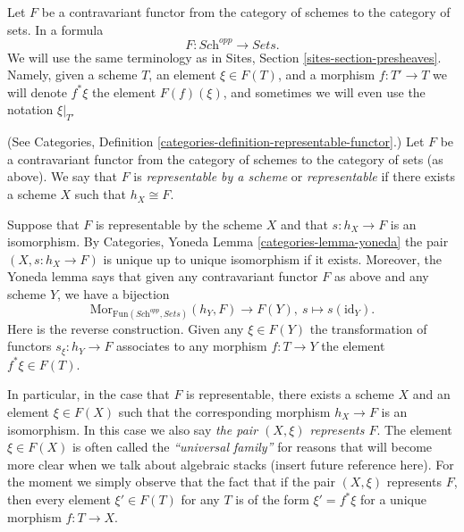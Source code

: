 \medskip\noindent
Let $F$ be a contravariant functor from the category
of schemes to the category of sets. In a formula
$$
F : \textit{Sch}^{opp}
\longrightarrow
\textit{Sets}.
$$
We will use the same terminology as in Sites, Section
\ref{sites-section-presheaves}. Namely, given a scheme
$T$, an element $\xi \in F(T)$, and a morphism $f : T' \to T$
we will denote $f^*\xi$ the element $F(f)(\xi)$, and sometimes
we will even use the notation $\xi|_{T'}$

\begin{definition}
\label{definition-representable-functor}
(See Categories, Definition \ref{categories-definition-representable-functor}.)
Let $F$ be a contravariant functor from the category
of schemes to the category of sets (as above).
We say that $F$ is {\it representable by a scheme}
or {\it representable} if there exists a scheme $X$
such that $h_X \cong F$.
\end{definition}

\noindent
Suppose that $F$ is representable by the scheme $X$ and that
$s : h_X \to F$ is an isomorphism.
By Categories, Yoneda Lemma \ref{categories-lemma-yoneda}
the pair $(X, s : h_X \to F)$ is unique up to unique
isomorphism if it exists.
Moreover, the Yoneda lemma says that
given any contravariant functor $F$ as above
and any scheme $Y$, we have a bijection
$$
\text{Mor}_{\text{Fun}(\textit{Sch}^{opp}, \textit{Sets})} (h_Y, F)
\longrightarrow
F(Y), \ 
s \longmapsto s(\text{id}_Y).
$$
Here is the reverse construction. Given any $\xi \in F(Y)$
the transformation of functors $s_\xi : h_Y \to F$
associates to any morphism $f : T \to Y$ the
element $f^*\xi \in F(T)$.

\medskip\noindent
In particular, in the case that $F$ is representable, there exists
a scheme $X$ and an element $\xi \in F(X)$ such that the corresponding
morphism $h_X \to F$ is an isomorphism.
In this case we also say {\it the pair $(X, \xi)$ represents $F$}.
The element $\xi \in F(X)$
is often called the {\it ``universal family''} for reasons that will become
more clear when we talk about algebraic stacks (insert future reference here).
For the moment we simply observe that the fact that if the pair $(X, \xi)$
represents $F$, then every element $\xi' \in F(T)$ for any $T$ is of
the form $\xi' = f^*\xi$ for a unique morphism $f : T \to X$.

